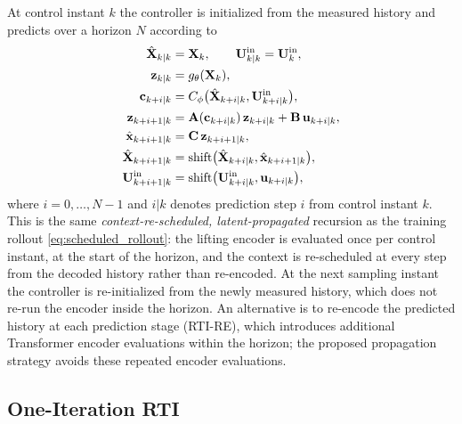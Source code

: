 \documentclass[journal]{IEEEtran}
\newcommand{\vx}{\mathbf{x}}
\newcommand{\vu}{\mathbf{u}}
\newcommand{\vz}{\mathbf{z}}
\newcommand{\mA}{\mathbf{A}}
\newcommand{\mB}{\mathbf{B}}
\newcommand{\mC}{\mathbf{C}}
\newcommand{\mX}{\mathbf{X}}
\newcommand{\mU}{\mathbf{U}}
\newcommand{\vc}{\mathbf{c}}
\begin{document}
At control instant $k$ the controller is initialized from the measured history and predicts over a horizon $N$ according to
\begin{align}
    \hat{\mX}_{k|k}&=\mX_k,\qquad \mU^{\mathrm{in}}_{k|k}=\mU^{\mathrm{in}}_k,\notag\\
    \vz_{k|k}&=g_\theta(\mX_k),\notag\\
    \vc_{k+i|k}&=C_\phi\big(\hat{\mX}_{k+i|k},\mU^{\mathrm{in}}_{k+i|k}\big),\notag\\
    \vz_{k+i+1|k}&=\mA(\vc_{k+i|k})\,\vz_{k+i|k}+\mB\,\vu_{k+i|k},\notag\\
    \hat{\vx}_{k+i+1|k}&=\mC\,\vz_{k+i+1|k},\notag\\
    \hat{\mX}_{k+i+1|k}&=\mathrm{shift}\big(\hat{\mX}_{k+i|k},\hat{\vx}_{k+i+1|k}\big),\notag\\
    \mU^{\mathrm{in}}_{k+i+1|k}&=\mathrm{shift}\big(\mU^{\mathrm{in}}_{k+i|k},\vu_{k+i|k}\big),
    \label{eq:scheduled_predictor}
\end{align}
where $i=0,\ldots,N-1$ and $i|k$ denotes prediction step $i$ from control instant $k$. This is the same \emph{context-re-scheduled, latent-propagated} recursion as the training rollout \eqref{eq:scheduled_rollout}: the lifting encoder is evaluated once per control instant, at the start of the horizon, and the context is re-scheduled at every step from the decoded history rather than re-encoded. At the next sampling instant the controller is re-initialized from the newly measured history, which does not re-run the encoder inside the horizon. An alternative is to re-encode the predicted history at each prediction stage (RTI-RE), which introduces additional Transformer encoder evaluations within the horizon; the proposed propagation strategy avoids these repeated encoder evaluations.

\subsection{One-Iteration RTI}
\end{document}
